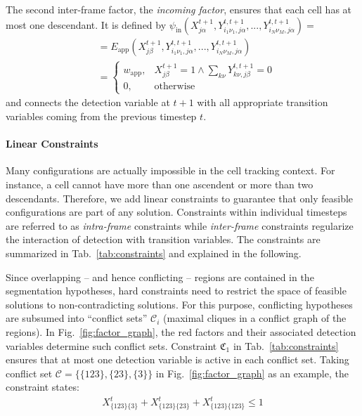\documentclass[10pt,twocolumn,letterpaper]{article}
\begin{document}
The second inter-frame factor, the \emph{incoming factor}, ensures that each cell has at most one 
descendant. It is defined by 
$\psi_{\mathrm{in}}(X_{j\alpha}^{t+1}, Y^{t,t+1}_{i_1\nu_1 ,j \alpha},...,Y^{t,t+1}_{i_N\nu_M,j\alpha }) =$
\begin{align}
    \label{eq:phi-in}
    &= E_{\text{app}}(X_{j\beta}^{t+1}, Y^{t,t+1}_{i_1\nu_1 ,j \alpha},...,Y^{t,t+1}_{i_N\nu_M,j\alpha }) \nonumber \\
    &= 
    \begin{cases}
        w_{\mathrm{app}}, & X_{j\beta}^{t+1} = 1 \wedge \sum_{k\nu}Y^{t,t+1}_{k\nu ,j\beta} = 0 \\
        0, & \mathrm{otherwise}
    \end{cases}    
\end{align}
and connects the detection variable at $t+1$ with all appropriate transition variables coming from the
previous timestep $t$. 


\paragraph{Linear Constraints} Many configurations are actually impossible in the cell tracking context. 
For instance,
a cell cannot have more than one ascendent or more than two descendants.
Therefore, we add linear constraints to guarantee that only feasible configurations are part
of any solution. Constraints %
within individual timesteps are referred to as \emph{intra-frame} constraints
while \emph{inter-frame} constraints regularize the interaction of detection with transition variables.
The constraints are summarized in Tab.~\ref{tab:constraints} and explained in the following.

Since overlapping -- and hence conflicting -- regions are contained in the segmentation hypotheses,
hard constraints need to
restrict the space of feasible solutions to non-contradicting solutions. For this purpose,
conflicting hypotheses are subsumed into ``conflict sets'' $\mathcal C_i$ (maximal cliques
in a conflict graph of the regions). In Fig.~\ref{fig:factor_graph}, the red factors and their 
associated detection variables determine such conflict sets.
Constraint $\mathfrak{C}_1$ in
Tab.~\ref{tab:constraints} ensures that at most one detection variable is active in each
conflict set. Taking conflict set $\mathcal{C} = \{ \{123\}, \{23\}, \{3\} \}$ in
Fig.~\ref{fig:factor_graph} as an example, the constraint states:
\begin{align}
    X_{\{123\}\{3\}}^t+X_{\{123\}\{23\}}^t+X_{\{123\}\{123\}}^t \le 1
\end{align}
\end{document}
